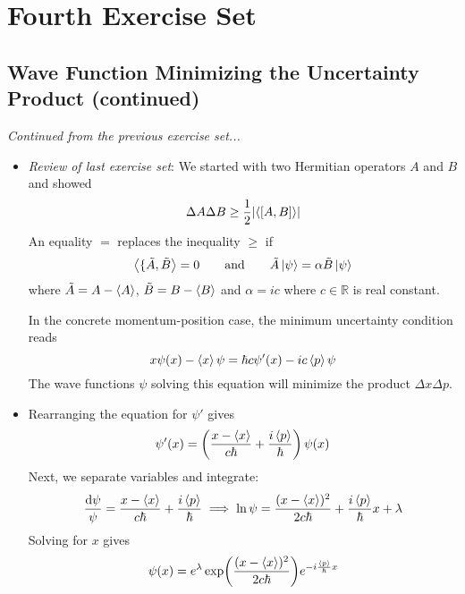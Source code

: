\documentclass[11pt, a4paper]{article}
\newcommand{\diff}{\mathop{}\!\mathrm{d}} %
\newcommand{\eqtext}[1]{\qquad \text{#1} \qquad}
\begin{document}
\section{Fourth Exercise Set}

\subsection{Wave Function Minimizing the Uncertainty Product (continued)}
\textit{Continued from the previous exercise set...}
\begin{itemize}
	\item \textit{Review of last exercise set}: We started with two Hermitian operators $ A  $ and $ B $ and showed
	\begin{equation*}
		\Delta A \Delta B \geq \frac{1}{2}\abs{\langle [A, B] \rangle}
	\end{equation*}
	An equality $ = $ replaces the inequality $ \geq $ if
	\begin{equation*}
		\ev{\{\tilde{A}, \tilde{B}} = 0 \eqtext{and} \tilde{A}\ket{\psi} = \alpha \tilde{B}\ket{\psi}
	\end{equation*}
	where $ \tilde{A} = A - \ev{A}$, $ \tilde{B} = B - \ev{B}$ and $ \alpha = ic $ where $ c \in \mathbb{R} $ is real constant.
	
	In the concrete momentum-position case, the minimum uncertainty condition reads
	\begin{equation*}
		x \psi(x) - \expval{x} \psi = \hbar c \psi'(x) - ic \expval{p} \psi
	\end{equation*}
	The wave functions $ \psi $ solving this equation will minimize the product $ \Delta x \Delta p $. 
	
	\item Rearranging the equation for $ \psi' $ gives
	\begin{equation*}
		\psi'(x) = \left(\frac{x - \ev{x}}{c\hbar} + \frac{i\ev{p}}{\hbar}\right)\psi(x)
	\end{equation*}
	Next, we separate variables and integrate:
	\begin{equation*}
		\frac{\diff \psi}{\psi} = \frac{x - \ev{x}}{c \hbar} + \frac{i\ev{p}}{\hbar} \implies \ln \psi = \frac{(x - \ev{x})^{2}}{2c \hbar} + \frac{i\ev{p}}{\hbar}x + \lambda
	\end{equation*}
	Solving for $ x $ gives
	\begin{equation*}
		\psi(x) = e^{\lambda}\exp(\frac{(x - \ev{x})^{2}}{2c\hbar})e^{-i\frac{\ev{p}}{\hbar}x}
	\end{equation*}
	

\end{itemize}
\end{document}
